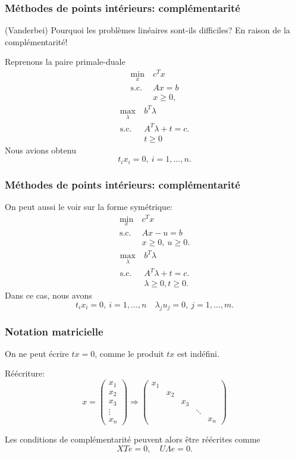 \documentclass[t,usepdftitle=false]{beamer}
\begin{document}
\begin{frame}
\frametitle{Méthodes de points intérieurs: complémentarité}

(Vanderbei) Pourquoi les problèmes linéaires sont-ils difficiles? En raison de la complémentarité!

\mbox{}

Reprenons la paire primale-duale
\begin{align*}
\min_x\ & c^T x \\
\mbox{s.c. } & Ax = b \\
& x \geq 0,
\end{align*}
\begin{align*}
\max_{\lambda} \  & b^T \lambda \\
\mbox{s.c. } & A^T \lambda  +t = c. \\
& t \geq 0
\end{align*}
Nous avions obtenu
\[
t_i x_i = 0, \ i = 1,\ldots, n.
\]

\end{frame}

\begin{frame}
\frametitle{Méthodes de points intérieurs: complémentarité}

On peut aussi le voir sur la forme symétrique:
\begin{align*}
\min_x\ & c^T x \\
\mbox{s.c. } & Ax - u = b \\
& x \geq 0,\ u \geq 0.
\end{align*}
\begin{align*}
\max_{\lambda} \  & b^T \lambda \\
\mbox{s.c. } & A^T \lambda  +t = c. \\
& \lambda \geq 0, t \geq 0.
\end{align*}
Dans ce cas, nous avons
\[
t_i x_i = 0,\ i = 1,\ldots,n \quad
\lambda_j u_j = 0,\ j = 1,\ldots, m.
\]

\end{frame}

\begin{frame}
\frametitle{Notation matricielle}

On ne peut écrire $tx = 0$, comme le produit $tx$ est indéfini.

\mbox{}

Réécriture:
\[
x = \begin{pmatrix}
x_1 \\ x_2 \\ x_3 \\ \vdots \\ x_n
\end{pmatrix}
\Rightarrow
\begin{pmatrix}
x_1 \\ & x_2 \\ & & x_3 \\ & & & \ddots \\ & & & & x_n
\end{pmatrix}
\]

\mbox{}

Les conditions de complémentarité peuvent alors être réécrites comme
\[
XTe = 0,\quad U\Lambda e = 0.
\]
\end{frame}
\end{document}
